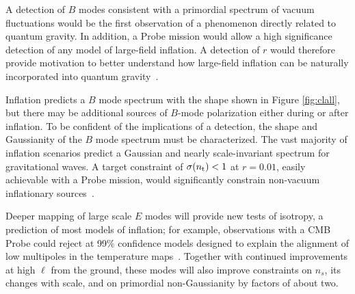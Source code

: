 A detection of $B$ modes consistent with a primordial spectrum of vacuum fluctuations would be the first observation of a phenomenon directly related to quantum gravity. In addition, a Probe mission would allow a high significance detection of any model of large-field inflation.
A detection of $r$ would therefore provide 
motivation to better understand how large-field inflation can be naturally incorporated into quantum gravity~\cite{Banks:2003sx,Baumann:2014nda,Brown:2015iha,Rudelius:2015xta,Silverstein:2008sg,Kaloper:2008fb,Marchesano:2014mla,Blumenhagen:2015xpa}. 

Inflation predicts a $B$ mode spectrum with the shape shown in Figure \ref{fig:clall}, but there may be additional sources 
of $B$-mode polarization either during or after 
inflation. To be confident of the implications of a detection, the shape and Gaussianity of the $B$ mode spectrum 
must be characterized. The vast majority of inflation scenarios predict a Gaussian and nearly scale-invariant spectrum for 
gravitational waves. A target constraint of $\sigma(n_{\rm t})<1$ at $r=0.01$, easily achievable with a Probe mission, would significantly constrain non-vacuum 
inflationary sources~\cite{Namba:2015gja,Peloso:2016gqs}.

Deeper mapping of large scale $E$ modes will provide new tests of isotropy, a prediction of most models of inflation; 
for example, observations with a CMB Probe could reject at 99\% confidence models designed to explain the alignment of low 
multipoles in the temperature maps~\cite{Dvorkin:2007jp}. 
Together with continued improvements at high $\ell$ from the ground, these modes will also improve constraints on $n_{s}$, 
its changes with scale, and on primordial non-Gaussianity by factors of about two. 

